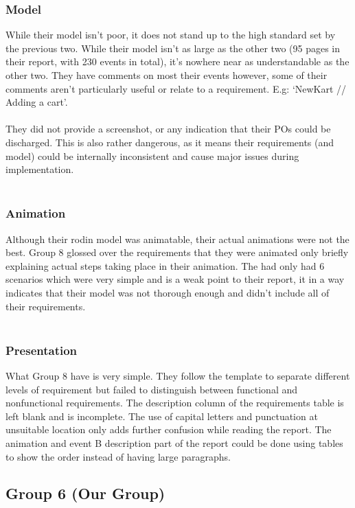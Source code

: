 \documentclass[a4paper]{article}
\begin{document}
\subsubsection{Model}
While their model isn’t poor, it does not stand up to the high standard set by the previous two. While their model isn’t as large as the other two (95 pages in their report, with 230 events in total), it’s nowhere near as understandable as the other two. They have comments on most their events however, some of their comments aren’t particularly useful or relate to a requirement. E.g: ‘NewKart // Adding a cart’.
\\\\
They did not provide a screenshot, or any indication that their POs could be discharged. This is also rather dangerous, as it means their requirements (and model) could be internally inconsistent and cause major issues during implementation. 
\\\\
\subsubsection{Animation}
Although their rodin model was animatable, their actual animations were not the best. Group 8 glossed over the requirements that they were animated only briefly explaining actual steps taking place in their animation. The had only had  6 scenarios which were very simple and is a weak point to their report, it in a way indicates that their model was not thorough enough and didn't include all of their requirements. 
\\\\
\subsubsection{Presentation}
What Group 8 have is very simple. They follow the template to separate different levels of requirement but failed to distinguish between functional and nonfunctional requirements. The description column of the requirements table is left blank and is incomplete. The use of capital letters and punctuation at unsuitable location only adds further confusion while reading the report. The animation and event B description part of the report could be done using tables to show the order instead of having large paragraphs.




\pagebreak
\subsection{Group 6 (Our Group)}
\end{document}
